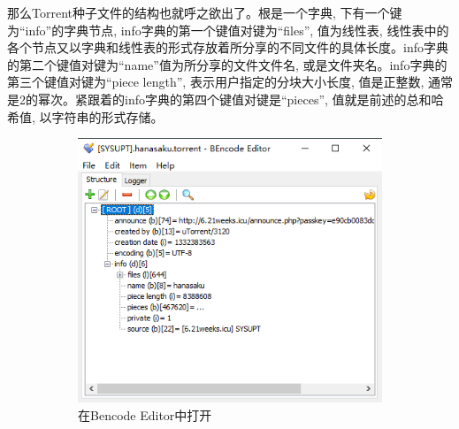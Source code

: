那么Torrent种子文件的结构也就呼之欲出了。根是一个字典, 下有一个键为``info''的字典节点, info字典的第一个键值对键为``files'', 值为线性表, 线性表中的各个节点又以字典和线性表的形式存放着所分享的不同文件的具体长度。info字典的第二个键值对键为``name''值为所分享的文件文件名, 或是文件夹名。info字典的第三个键值对键为``piece length'', 表示用户指定的分块大小长度, 值是正整数, 通常是2的幂次。紧跟着的info字典的第四个键值对键是``pieces'', 值就是前述的总和哈希值, 以字符串的形式存储。

\begin{figure}[ht!]
	\centering
	\begin{subfigure}{0.45\textwidth}
		\centering
		\includegraphics[width=\textwidth]{support-files/2.1-torrent-file-in-bencode-editor.png}
		\caption{在Bencode Editor中打开}
		\label{fig:torrent_in_bencode}
	\end{subfigure}
	\makebox[0.05\textwidth]{}
	\begin{subfigure}{0.45\textwidth}
		\centering

\end{subfigure}
\end{figure}
